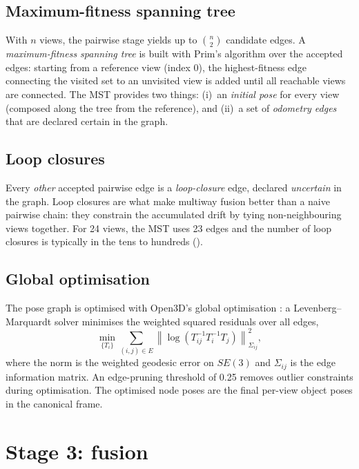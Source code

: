 \subsection{Maximum-fitness spanning tree}
With $n$ views, the pairwise stage yields up to $\binom{n}{2}$ candidate
edges. A \emph{maximum-fitness spanning tree} is built with Prim's algorithm
\citep{cormen2009introduction} over the accepted edges: starting from a
reference view (index 0), the highest-fitness edge connecting the visited set
to an unvisited view is added until all reachable views are connected. The MST
provides two things: (i)~an \emph{initial pose} for every view (composed along
the tree from the reference), and (ii)~a set of \emph{odometry edges} that are
declared certain in the graph.

\subsection{Loop closures}
Every \emph{other} accepted pairwise edge is a \emph{loop-closure} edge,
declared \emph{uncertain} in the graph. Loop closures are what make multiway
fusion better than a naive pairwise chain: they constrain the accumulated
drift by tying non-neighbouring views together. For 24 views, the MST uses 23
edges and the number of loop closures is typically in the tens to hundreds
().

\subsection{Global optimisation}
The pose graph is optimised with Open3D's global optimisation
\citep{choi2015robust,zhou2018open3d}: a Levenberg--Marquardt solver minimises
the weighted squared residuals over all edges,
\begin{equation}
\label{eq:posegraph}
\min_{\{T_i\}} \sum_{(i,j)\in E}
\left\lVert \log\!\left( T_{ij}^{-1} T_i^{-1} T_j \right) \right\rVert^2_{\Sigma_{ij}},
\end{equation}
where the norm is the weighted geodesic error on $SE(3)$ and $\Sigma_{ij}$ is
the edge information matrix. An edge-pruning threshold of 0.25 removes
outlier constraints during optimisation. The optimised node poses are the
final per-view object poses in the canonical frame.

\section{Stage 3: fusion}
\label{sec:routea_fusion}

